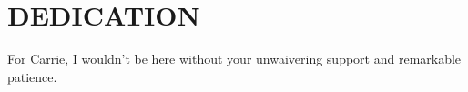 \chapter*{DEDICATION}

For Carrie, I wouldn't be here without your unwaivering support and remarkable patience.